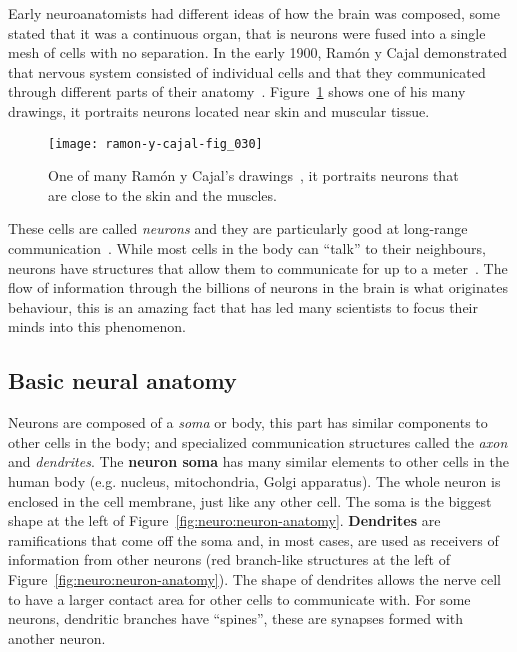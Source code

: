 Early neuroanatomists had different ideas of how the brain was composed, some stated that it was a continuous organ, that is neurons were fused into a single mesh of cells with no separation. In the early 1900, Ramón y Cajal demonstrated that nervous system consisted of individual cells and that they communicated through different parts of their anatomy~\cite{Nemri:2010}. Figure~\ref{fig:neuro:ramon-y-cajal-neuro} shows one of his many drawings, it portraits neurons located near skin and muscular tissue.

\begin{figure}[hbt]
  \begin{center}
    \texttt{[image: ramon-y-cajal-fig\_030]}
    \caption{One of many Ramón y Cajal's drawings~\cite{cervantes-images}, it portraits neurons that are close to the skin and the muscles.}
    \label{fig:neuro:ramon-y-cajal-neuro}
  \end{center}
\end{figure}

These cells are called \emph{neurons} and they are particularly good at  long-range communication~\cite{thompson2000brain}. While most cells in the body can ``talk'' to their neighbours, neurons have structures that allow them to communicate for up to a meter~\cite{eye-brain-vision-hubel1995}. The flow of information through the billions of neurons in the brain is what originates behaviour, this is an amazing fact that has led many scientists to focus their minds into this phenomenon.

\subsection{Basic neural anatomy}

Neurons are composed of a \emph{soma} or body, this part has similar components to other cells in the body; and specialized communication structures called the \emph{axon} and \emph{dendrites}. The \textbf{neuron soma} has many similar elements to other cells in the human body (e.g. nucleus, mitochondria, Golgi apparatus). The whole neuron is enclosed in the cell membrane, just like any other cell. The soma is the biggest shape at the left of Figure~\ref{fig:neuro:neuron-anatomy}. \textbf{Dendrites} are ramifications that come off the soma and, in most cases, are used as receivers of information from other neurons (red branch-like structures at the left of Figure~\ref{fig:neuro:neuron-anatomy}). The shape of dendrites allows the nerve cell to have a larger contact area for other cells to communicate with. For some neurons, dendritic branches have ``spines'', these are synapses formed with another neuron.

